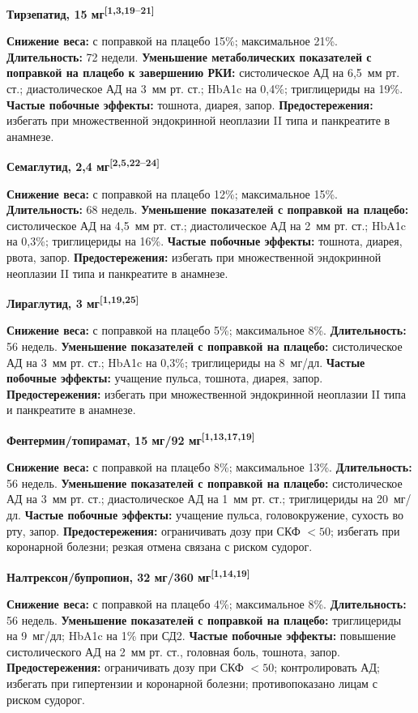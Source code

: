 \documentclass[11pt,a4paper]{article}
\newcommand{\src}[1]{\textsuperscript{[#1]}}
\newcommand{\heading}[1]{\par\medskip\textbf{#1}\par}
\begin{document}
\heading{Тирзепатид, 15 мг\src{1,3,19--21}\textsuperscript{\dag}}
\textbf{Снижение веса:} с поправкой на плацебо 15\%; максимальное 21\%. \textbf{Длительность:} 72 недели. \textbf{Уменьшение метаболических показателей с поправкой на плацебо к завершению РКИ:} систолическое АД на 6,5~мм рт. ст.; диастолическое АД на 3~мм рт. ст.; HbA1c на 0,4\%; триглицериды на 19\%. \textbf{Частые побочные эффекты:} тошнота, диарея, запор. \textbf{Предостережения:} избегать при множественной эндокринной неоплазии II типа и панкреатите в анамнезе.

\heading{Семаглутид, 2,4 мг\src{2,5,22--24}}
\textbf{Снижение веса:} с поправкой на плацебо 12\%; максимальное 15\%. \textbf{Длительность:} 68 недель. \textbf{Уменьшение показателей с поправкой на плацебо:} систолическое АД на 4,5~мм рт. ст.; диастолическое АД на 2~мм рт. ст.; HbA1c на 0,3\%; триглицериды на 16\%. \textbf{Частые побочные эффекты:} тошнота, диарея, рвота, запор. \textbf{Предостережения:} избегать при множественной эндокринной неоплазии II типа и панкреатите в анамнезе.

\heading{Лираглутид, 3 мг\src{1,19,25}}
\textbf{Снижение веса:} с поправкой на плацебо 5\%; максимальное 8\%. \textbf{Длительность:} 56 недель. \textbf{Уменьшение показателей с поправкой на плацебо:} систолическое АД на 3~мм рт. ст.; HbA1c на 0,3\%; триглицериды на 8~мг/дл. \textbf{Частые побочные эффекты:} учащение пульса, тошнота, диарея, запор. \textbf{Предостережения:} избегать при множественной эндокринной неоплазии II типа и панкреатите в анамнезе.

\heading{Фентермин/топирамат, 15 мг/92 мг\src{1,13,17,19}}
\textbf{Снижение веса:} с поправкой на плацебо 8\%; максимальное 13\%. \textbf{Длительность:} 56 недель. \textbf{Уменьшение показателей с поправкой на плацебо:} систолическое АД на 3~мм рт. ст.; диастолическое АД на 1~мм рт. ст.; триглицериды на 20~мг/дл. \textbf{Частые побочные эффекты:} учащение пульса, головокружение, сухость во рту, запор. \textbf{Предостережения:} ограничивать дозу при СКФ $<50$; избегать при коронарной болезни; резкая отмена связана с риском судорог.

\heading{Налтрексон/бупропион, 32 мг/360 мг\src{1,14,19}}
\textbf{Снижение веса:} с поправкой на плацебо 4\%; максимальное 8\%. \textbf{Длительность:} 56 недель. \textbf{Уменьшение показателей с поправкой на плацебо:} триглицериды на 9~мг/дл; HbA1c на 1\% при СД2. \textbf{Частые побочные эффекты:} повышение систолического АД на 2~мм рт. ст., головная боль, тошнота, запор. \textbf{Предостережения:} ограничивать дозу при СКФ $<50$; контролировать АД; избегать при гипертензии и коронарной болезни; противопоказано лицам с риском судорог.
\end{document}
